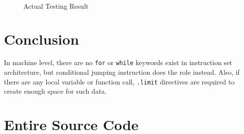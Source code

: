 \documentclass[a4paper, 12pt]{article}
\begin{document}
    \begin{figure}[H]
        \begin{lstlisting}
        
        \end{lstlisting}

        \centering        
        \caption{Actual Testing Result}
    \end{figure}


    \section{Conclusion}
    In machine level, there are no \texttt{for} or \texttt{while} keywords exist in instruction set architecture, but conditional jumping instruction does the role instead. Also, if there are any local variable or function call, \texttt{.limit} directives are required to create enough space for such data.

    \section{Entire Source Code}
\end{document}
